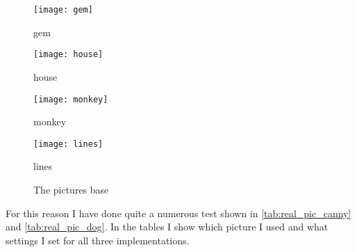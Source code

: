 \begin{figure}[H]
\centering
\begin{minipage}[t]{.49\textwidth}
\centering
\texttt{[image: gem]}
\addtocounter{figure}{-1}
\captionsetup{labelformat=empty}
\caption[]{gem}
\end{minipage}
\begin{minipage}[t]{.49\textwidth}
\centering
\texttt{[image: house]}
\addtocounter{figure}{-1}
\captionsetup{labelformat=empty}
\caption[]{house}
\end{minipage}
\begin{minipage}[t]{.49\textwidth}
\centering
\texttt{[image: monkey]}
\addtocounter{figure}{-1}
\captionsetup{labelformat=empty}
\caption[]{monkey}
\end{minipage}
\begin{minipage}[t]{.49\textwidth}
\centering
\texttt{[image: lines]}
\addtocounter{figure}{-1}
\captionsetup{labelformat=empty}
\caption[]{lines}
\end{minipage}
\caption{The pictures base}
\label{fig:pictures}
\end{figure}

 For this reason I have done quite a numerous test shown in \autoref{tab:real_pic_canny} and \autoref{tab:real_pic_dog}. In the tables I show which picture I used and what settings I set for all three implementations.

\begin{table}[H]
\centering
{}
\caption{Test plans for the Real picture tester for \ac{Canny} algorithm}
\label{tab:real_pic_canny}
\end{table}


